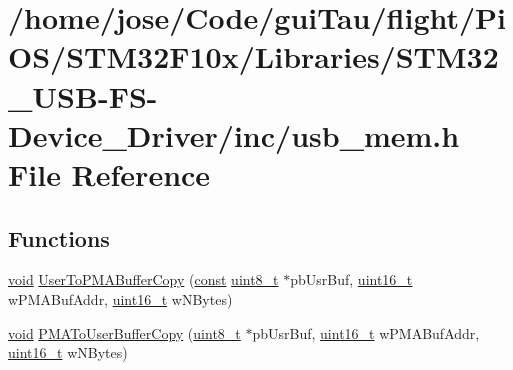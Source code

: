 \hypertarget{_s_t_m32_f10x_2_libraries_2_s_t_m32___u_s_b-_f_s-_device___driver_2inc_2usb__mem_8h}{\section{/home/jose/\-Code/gui\-Tau/flight/\-Pi\-O\-S/\-S\-T\-M32\-F10x/\-Libraries/\-S\-T\-M32\-\_\-\-U\-S\-B-\/\-F\-S-\/\-Device\-\_\-\-Driver/inc/usb\-\_\-mem.h File Reference}
\label{_s_t_m32_f10x_2_libraries_2_s_t_m32___u_s_b-_f_s-_device___driver_2inc_2usb__mem_8h}
}
\subsection*{Functions}
\begin{DoxyCompactItemize}
\item 
\hyperlink{group___n_a_m_e_ga18028b8badbf1ea7e704ccac3c488e82}{void} \hyperlink{_s_t_m32_f10x_2_libraries_2_s_t_m32___u_s_b-_f_s-_device___driver_2inc_2usb__mem_8h_a7e80055e83c3a7bf6229e0ff48c8bbc5}{User\-To\-P\-M\-A\-Buffer\-Copy} (\hyperlink{group___n_a_m_e_ga7ae6d0e43244213b34de2c2b9aa30da6}{const} \hyperlink{stdint_8h_aba7bc1797add20fe3efdf37ced1182c5}{uint8\-\_\-t} $\ast$pb\-Usr\-Buf, \hyperlink{stdint_8h_a273cf69d639a59973b6019625df33e30}{uint16\-\_\-t} w\-P\-M\-A\-Buf\-Addr, \hyperlink{stdint_8h_a273cf69d639a59973b6019625df33e30}{uint16\-\_\-t} w\-N\-Bytes)
\item 
\hyperlink{group___n_a_m_e_ga18028b8badbf1ea7e704ccac3c488e82}{void} \hyperlink{_s_t_m32_f10x_2_libraries_2_s_t_m32___u_s_b-_f_s-_device___driver_2inc_2usb__mem_8h_ab6dd9414600ffbf779acfc5266f59353}{P\-M\-A\-To\-User\-Buffer\-Copy} (\hyperlink{stdint_8h_aba7bc1797add20fe3efdf37ced1182c5}{uint8\-\_\-t} $\ast$pb\-Usr\-Buf, \hyperlink{stdint_8h_a273cf69d639a59973b6019625df33e30}{uint16\-\_\-t} w\-P\-M\-A\-Buf\-Addr, \hyperlink{stdint_8h_a273cf69d639a59973b6019625df33e30}{uint16\-\_\-t} w\-N\-Bytes)
\end{DoxyCompactItemize}


